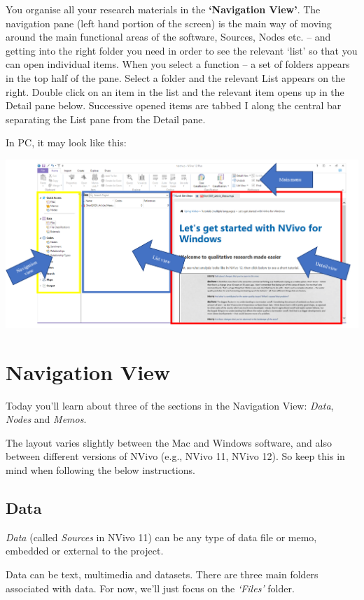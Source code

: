 \documentclass[
]{book}
\begin{document}
You organise all your research materials in the \textbf{`Navigation View'}. The navigation pane (left hand portion of the screen) is the main way of moving around the main functional areas of the software, Sources, Nodes etc. -- and getting into the right folder you need in order to see the relevant `list' so that you can open individual items. When you select a function -- a set of folders appears in the top half of the pane. Select a folder and the relevant List appears on the right. Double click on an item in the list and the relevant item opens up in the Detail pane below. Successive opened items are tabbed I along the central bar separating the List pane from the Detail pane.

In PC, it may look like this:

\includegraphics{imgs/interface_pc.png}

\hypertarget{navigation-view}{%
\section{Navigation View}\label{navigation-view}}

Today you'll learn about three of the sections in the Navigation View: \emph{Data}, \emph{Nodes} and \emph{Memos}.

The layout varies slightly between the Mac and Windows software, and also between different versions of NVivo (e.g., NVivo 11, NVivo 12). So keep this in mind when following the below instructions.

\hypertarget{data}{%
\subsection{Data}\label{data}}

\emph{Data} (called \emph{Sources} in NVivo 11) can be any type of data file or memo, embedded or external to the project.

Data can be text, multimedia and datasets. There are three main folders associated with data. For now, we'll just focus on the \emph{`Files'} folder.
\end{document}
